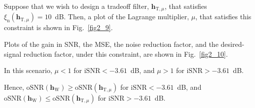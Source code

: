 \documentclass[10pt,pdflatex,headrule,landscape]{beamer}
\begin{document}
\begin{frame}


\end{frame}
\begin{frame}


\end{frame}
\begin{frame}[allowframebreaks]

Suppose that we wish to design a tradeoff filter, $\mathbf{h}_{\mathrm{T},\mu}$, that satisfies $\xi_{\mathrm{n}}\left( \mathbf{h}_{\mathrm{T},\mu} \right)=10$~dB. Then, a plot of the Lagrange multiplier, $\mu$, that satisfies this constraint is shown in Fig.~\ref{fig2_9}.

Plots of the gain in SNR, the MSE, the noise reduction factor, and the desired-signal reduction factor, under this constraint, are shown in Fig.~\ref{fig2_10}.

In this scenario, $\mu<1$ for $\mathrm{iSNR}<-3.61$~dB, and $\mu>1$ for $\mathrm{iSNR}>-3.61$~dB.

Hence, $\mathrm{oSNR}\left( \mathbf{h}_{\mathrm{W}} \right) \geq \mathrm{oSNR} \left( \mathbf{h}_{\mathrm{T},\mu} \right)$ for $\mathrm{iSNR}<-3.61$~dB, and $\mathrm{oSNR}\left( \mathbf{h}_{\mathrm{W}} \right) \leq \mathrm{oSNR} \left( \mathbf{h}_{\mathrm{T},\mu} \right)$ for $\mathrm{iSNR}>-3.61$~dB.

\end{frame}
\end{document}
